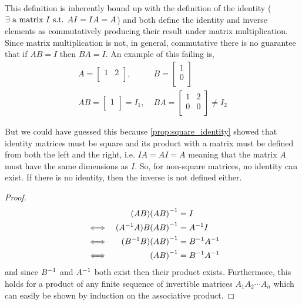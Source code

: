 \documentclass[MathsNotesBase.tex]{subfiles}
\begin{document}
{		\medskip
		This definition is inherently bound up with the definition of the identity ($\exists \text{ a matrix } I \text{ s.t. } AI = IA = A$) and both define the identity and inverse elements as commutatively producing their result under matrix multiplication. Since matrix multiplication is not, in general, commutative there is no guarantee that if $AB = I$ then $BA = I$. An example of this failing is,
		\begin{align*}
			A = 
			\begin{bmatrix}
			1 & 2 \\
			\end{bmatrix},\;
			&B =
			\begin{bmatrix}
			1 \\
			0 \\
			\end{bmatrix}
			\\[10pt]
			AB = 
			\begin{bmatrix}
			1 \\
			\end{bmatrix} = I_1,\;
			&BA =
			\begin{bmatrix}
			1 & 2 \\
			0 & 0 \\
			\end{bmatrix} \neq I_2
		\end{align*}
		
		But we could have guessed this because \autoref{prop:square_identity} showed that identity matrices must be square and its product with a matrix must be defined from both the left and the right, i.e. $IA = AI = A$ meaning that the matrix $A$ must have the same dimensions as $I$. So, for non-square matrices, no identity can exist. If there is no identity, then the inverse is not defined either.
		
		\medskip
		\begin{proof}
		\begin{align*}
		& 	  &	(AB){(AB)}^{-1} &= I \\
		&\iff &	({A}^{-1}A)B{(AB)}^{-1} &= {A}^{-1}I \\
		&\iff &	({B}^{-1}B){(AB)}^{-1} &= {B}^{-1}{A}^{-1} \\
		&\iff &	{(AB)}^{-1} &= {B}^{-1}{A}^{-1} \\
		\end{align*}
		and since ${B}^{-1}$ and ${A}^{-1}$ both exist then their product exists.
		Furthermore, this holds for a product of any finite sequence of invertible matrices $A_1A_2\cdots A_n$ which can easily be shown by induction on the associative product.
		\end{proof}
	}
\end{document}
